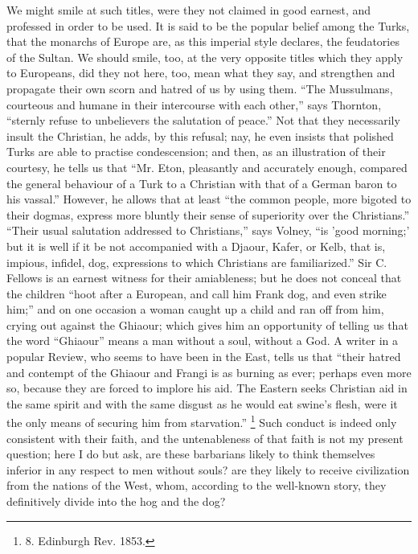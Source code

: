 We might smile at such titles,
were they not claimed in good earnest, and professed in order to be
used. It is said to be the popular belief among the Turks, that the
monarchs of Europe are, as this imperial style declares, the
feudatories of the Sultan. We should smile, too, at the very opposite
titles which they apply to Europeans, did they not here, too, mean
what they say, and strengthen and propagate their own scorn and hatred
of us by using them. ``The Mussulmans, courteous and humane in their
intercourse with each other,'' says Thornton, ``sternly refuse to
unbelievers the salutation of peace.'' Not that they necessarily insult
the Christian, he adds, by this refusal; nay, he even insists that
polished Turks are able to practise condescension; and then, as an
illustration of their courtesy, he tells us that ``Mr. Eton, pleasantly
and accurately enough, compared the general behaviour of a Turk to a
Christian with that of a German baron to his vassal.'' However, he
allows that at least ``the common people, more bigoted to their dogmas,
express more bluntly their sense of superiority over the Christians.'' ``Their
usual salutation addressed to Christians,'' says Volney, ``is 'good
morning;' but it is well if it be not accompanied with a Djaour, Kafer,
or Kelb, that is, impious, infidel, dog, expressions to which
Christians are familiarized.'' Sir C. Fellows is an earnest witness for
their amiableness; but he does not conceal that the children ``hoot
after a European, and call him Frank dog, and even strike him;'' and on
one occasion a woman caught up a child and ran off from him, crying
out against the Ghiaour; which gives him an opportunity of telling us
that the word ``Ghiaour'' means a man without a soul, without a God. A
writer in a popular Review, who seems to have been in the East, tells
us that ``their hatred and contempt of the Ghiaour and Frangi is as
burning as ever; perhaps even more so, because they are forced to
implore his aid. The Eastern seeks Christian aid in the same spirit
and with the same disgust as he would eat swine's flesh, were it the
only means of securing him from starvation.'' \footnote{8.
Edinburgh Rev. 1853.} Such conduct is indeed only consistent with their faith, and
the untenableness of that faith is not my present question; here I do
but ask, are these barbarians likely to think themselves inferior in
any respect to men without souls? are they likely to receive
civilization from the nations of the West, whom, according to the
well-known story, they definitively divide into the hog and the dog?

